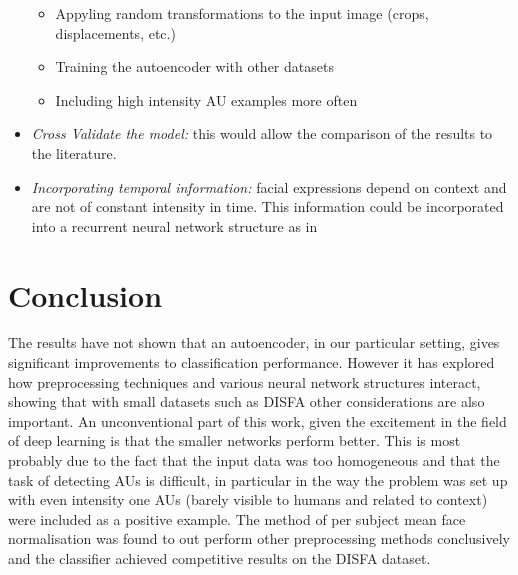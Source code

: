 \begin{itemize}
            \begin{itemize}
              \item Appyling random transformations to the input image (crops, displacements, etc.)
              \item Training the autoencoder with other datasets
              \item Including high intensity AU examples more often
            \end{itemize}
      \item \textit{ Cross Validate the model:} this would allow the comparison of the results
            to the literature.
      \item \textit{ Incorporating temporal information:} facial expressions depend on context
            and are not of constant intensity in time. This information could be incorporated into
            a recurrent neural network structure as in \cite{Jaiswal2016}
    \end{itemize}

\chapter{Conclusion}
  The results have not shown that an autoencoder, in our particular setting,
  gives significant improvements to classification performance. However it has
  explored how preprocessing techniques and various neural network structures
  interact, showing that with small datasets such as DISFA other considerations
  are also important. An unconventional part of this work, given the
  excitement in the field of deep learning is that the smaller networks
  perform better. This is most probably due to the fact that the input data
  was too homogeneous and that the task of detecting AUs is difficult, in
  particular in the way the problem was set up with even intensity one AUs
  (barely visible to humans and related to context) were included as a
  positive example. The method of per subject mean face normalisation was
  found to out perform other preprocessing methods conclusively and the
  classifier achieved competitive results on the DISFA dataset.
